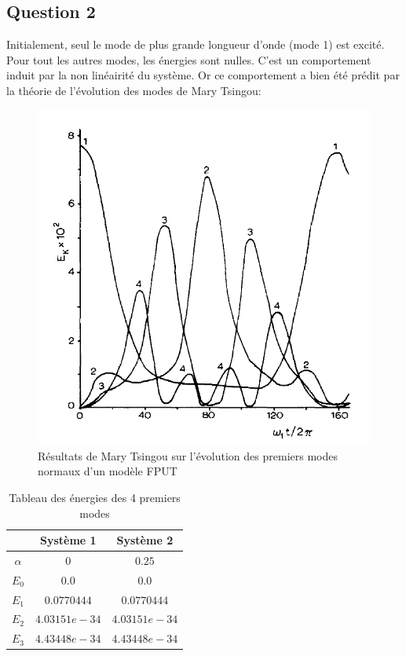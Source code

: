 \documentclass[a4paper, 11pt]{article}
\begin{document}
\subsection*{Question 2}
Initialement, seul le mode de plus grande longueur d'onde (mode 1) est excité. Pour tout les autres modes, les énergies sont nulles. C'est un comportement induit par la non linéairité du système.
Or ce comportement a bien été prédit par la théorie de l'évolution des modes de Mary Tsingou:
\begin{figure}[H]
    \centering
    \includegraphics[scale=0.5]{pics/FPUT.png}
    \caption{Résultats de Mary Tsingou sur l’évolution des premiers modes normaux d’un
modèle FPUT}
    \label{fig:Mary_graph}
\end{figure}
\begin{table}[H]
    \centering
    \begin{tabular}{|c|c|c|}
    \hline
         & Système 1 & Système 2\\
         \hline \hline
        $\alpha$ & $0$ & $0.25$ \\\hline
        $E_0$ & $0.0$ & $0.0$ \\\hline
        $E_1$ & $0.0770444$ & $0.0770444$ \\\hline
        $E_2$ & $4.03151e-34$ & $4.03151e-34$ \\\hline
        $E_3$ & $4.43448e-34$ & $4.43448e-34$ \\
        \hline
    \end{tabular}
    \caption{Tableau des énergies des 4 premiers modes}
    \label{tab: energie_mode}
\end{table}
\end{document}
